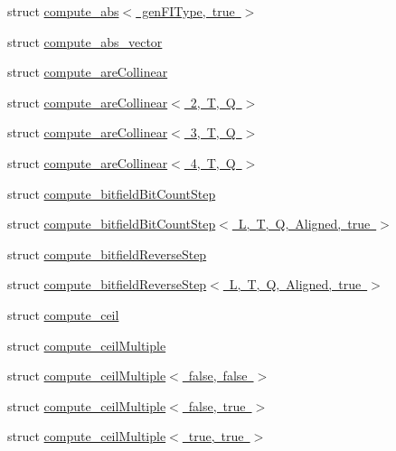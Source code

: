 \begin{DoxyCompactItemize}
\item 
struct \mbox{\hyperlink{structglm_1_1detail_1_1compute__abs_3_01gen_f_i_type_00_01true_01_4}{compute\+\_\+abs$<$ gen\+F\+I\+Type, true $>$}}
\item 
struct \mbox{\hyperlink{structglm_1_1detail_1_1compute__abs__vector}{compute\+\_\+abs\+\_\+vector}}
\item 
struct \mbox{\hyperlink{structglm_1_1detail_1_1compute__are_collinear}{compute\+\_\+are\+Collinear}}
\item 
struct \mbox{\hyperlink{structglm_1_1detail_1_1compute__are_collinear_3_012_00_01_t_00_01_q_01_4}{compute\+\_\+are\+Collinear$<$ 2, T, Q $>$}}
\item 
struct \mbox{\hyperlink{structglm_1_1detail_1_1compute__are_collinear_3_013_00_01_t_00_01_q_01_4}{compute\+\_\+are\+Collinear$<$ 3, T, Q $>$}}
\item 
struct \mbox{\hyperlink{structglm_1_1detail_1_1compute__are_collinear_3_014_00_01_t_00_01_q_01_4}{compute\+\_\+are\+Collinear$<$ 4, T, Q $>$}}
\item 
struct \mbox{\hyperlink{structglm_1_1detail_1_1compute__bitfield_bit_count_step}{compute\+\_\+bitfield\+Bit\+Count\+Step}}
\item 
struct \mbox{\hyperlink{structglm_1_1detail_1_1compute__bitfield_bit_count_step_3_01_l_00_01_t_00_01_q_00_01_aligned_00_01true_01_4}{compute\+\_\+bitfield\+Bit\+Count\+Step$<$ L, T, Q, Aligned, true $>$}}
\item 
struct \mbox{\hyperlink{structglm_1_1detail_1_1compute__bitfield_reverse_step}{compute\+\_\+bitfield\+Reverse\+Step}}
\item 
struct \mbox{\hyperlink{structglm_1_1detail_1_1compute__bitfield_reverse_step_3_01_l_00_01_t_00_01_q_00_01_aligned_00_01true_01_4}{compute\+\_\+bitfield\+Reverse\+Step$<$ L, T, Q, Aligned, true $>$}}
\item 
struct \mbox{\hyperlink{structglm_1_1detail_1_1compute__ceil}{compute\+\_\+ceil}}
\item 
struct \mbox{\hyperlink{structglm_1_1detail_1_1compute__ceil_multiple}{compute\+\_\+ceil\+Multiple}}
\item 
struct \mbox{\hyperlink{structglm_1_1detail_1_1compute__ceil_multiple_3_01false_00_01false_01_4}{compute\+\_\+ceil\+Multiple$<$ false, false $>$}}
\item 
struct \mbox{\hyperlink{structglm_1_1detail_1_1compute__ceil_multiple_3_01false_00_01true_01_4}{compute\+\_\+ceil\+Multiple$<$ false, true $>$}}
\item 
struct \mbox{\hyperlink{structglm_1_1detail_1_1compute__ceil_multiple_3_01true_00_01true_01_4}{compute\+\_\+ceil\+Multiple$<$ true, true $>$}}

\end{DoxyCompactItemize}
